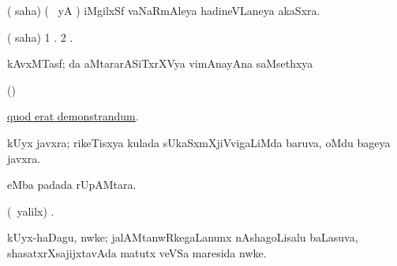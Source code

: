 \bentry
{}
\gl{\nA}
\bmng
( saha) (\bava\  yA ) iMgilxSf vaNaRmAleya hadineVLaneya akaSxra. 
\emng
\eentry

\bentry
{}
\gl{\saMkiSx}
\bmng
( saha) 
\bnum
\num{1} . 
\num{2} . 
\enum
\emng
\eentry

\bentry
{}
\gl{\nA}
\bmng
kAvxMTasf; \AseTxrXV da aMtararASiTxrXVya vimAnayAna saMsethxya \saMkiSx\  
\emng
\eentry

\bentry
{} 
\gl{\saMkiSx}	
\bmng
{} 
\emng
\eentry

\bentry
{}
\gl{\saMkiSx}
\bmng
{} 
\emng
\eentry

\bentry
{}
\gl{\saMkiSx}
\expl{}
\bmng
(\nAyxshA)  
\emng
\eentry

\bentry
{}
\gl{\saMkiSx}
\bmng
\hyperlink{quod erat demonstrandum}{quod erat demonstrandum}. 
\emng
\eentry

\bentry
{}
\gl{\nA}
\bmng
kUyx javxra; rikeTisxya kulada sUkaSxmXjiVvigaLiMda baruva, oMdu bageya javxra. 
\emng
\eentry

\bentry
{}
\gl{\nA}
\bmng
{} eMba padada rUpAMtara. 
\emng
\eentry

\bentry
{}
\gl{\saMkiSx}
\expl{}
\bmng
{} 
\emng
\eentry

\bentry
{}
\gl{\saMkiSx}
\bmng
{} 
\emng
\eentry

\bentry
{}
\gl{\saMkiSx}
\bmng
{} 
\emng
\eentry

\bentry
{}
\gl{\saMkiSx}
\bmng
{} 
\emng
\eentry

\bentry
{}
\gl{\saMkiSx}
\bmng
(\UK\ yalilx) . 
\emng
\eentry

\bentry
{}
\gl{\saMkiSx}
\bmng
{} 
\emng
\eentry

\bentry
{}
\gl{\nA}
\bmng
kUyx-haDagu, nwke; jalAMtanwRkegaLanunx nAshagoLisalu baLasuva, shasatxrXsajijxtavAda matutx veVSa maresida nwke. 
\emng
\eentry

